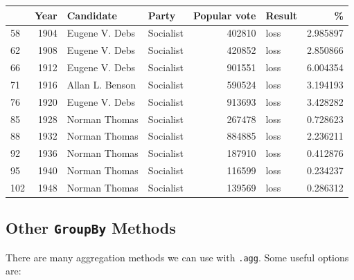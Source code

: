 \documentclass[
  letterpaper,
  DIV=11,
  numbers=noendperiod]{scrreprt}
\begin{document}
\begin{tabular}{lrllrlr}
\toprule
{} &  Year &        Candidate &      Party &  Popular vote & Result &         \% \\
\midrule
58  &  1904 &   Eugene V. Debs &  Socialist &        402810 &   loss &  2.985897 \\
62  &  1908 &   Eugene V. Debs &  Socialist &        420852 &   loss &  2.850866 \\
66  &  1912 &   Eugene V. Debs &  Socialist &        901551 &   loss &  6.004354 \\
71  &  1916 &  Allan L. Benson &  Socialist &        590524 &   loss &  3.194193 \\
76  &  1920 &   Eugene V. Debs &  Socialist &        913693 &   loss &  3.428282 \\
85  &  1928 &    Norman Thomas &  Socialist &        267478 &   loss &  0.728623 \\
88  &  1932 &    Norman Thomas &  Socialist &        884885 &   loss &  2.236211 \\
92  &  1936 &    Norman Thomas &  Socialist &        187910 &   loss &  0.412876 \\
95  &  1940 &    Norman Thomas &  Socialist &        116599 &   loss &  0.234237 \\
102 &  1948 &    Norman Thomas &  Socialist &        139569 &   loss &  0.286312 \\
\bottomrule
\end{tabular}

\hypertarget{other-groupby-methods}{%
\subsection{\texorpdfstring{Other \texttt{GroupBy}
Methods}{Other GroupBy Methods}}\label{other-groupby-methods}}

There are many aggregation methods we can use with \texttt{.agg}. Some
useful options are:
\end{document}
